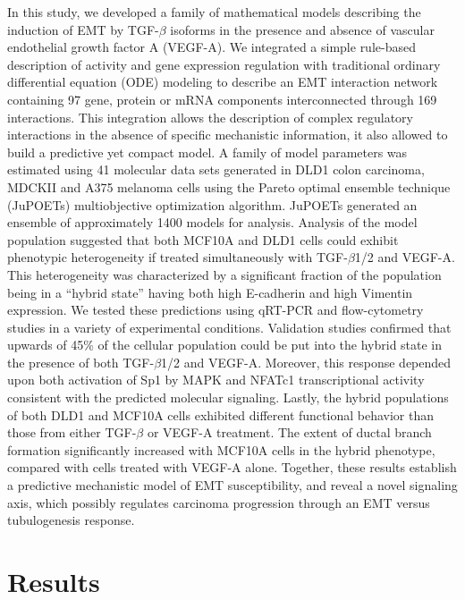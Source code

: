 \documentclass[11pt,letterpaper]{article}
\begin{document}
In this study, we developed a family of mathematical models describing the induction of EMT by TGF-$\beta$ isoforms in the presence and absence of vascular endothelial growth factor A (VEGF-A).
We integrated a simple rule-based description of activity and gene expression regulation with traditional ordinary differential equation (ODE) modeling to describe an EMT interaction network containing 97 gene, protein or mRNA components interconnected through 169 interactions.
This integration allows the description of complex regulatory interactions in the absence of specific mechanistic information, it also allowed to build a predictive yet compact model.
A family of model parameters was estimated using 41 molecular data sets generated in DLD1 colon carcinoma, MDCKII and A375 melanoma cells using the Pareto optimal ensemble technique (JuPOETs) multiobjective optimization algorithm.
JuPOETs generated an ensemble of approximately 1400 models for analysis.
Analysis of the model population suggested that both MCF10A and DLD1 cells could exhibit phenotypic heterogeneity if treated simultaneously with TGF-$\beta$1/2 and VEGF-A.
This heterogeneity was characterized by a significant fraction of the population being in a “hybrid state” having both high E-cadherin and high Vimentin expression.
We tested these predictions using qRT-PCR and flow-cytometry studies in a variety of experimental conditions.
Validation studies confirmed that upwards of 45\% of the cellular population could be put into the hybrid state in the presence of both TGF-$\beta$1/2 and VEGF-A.
Moreover, this response depended upon both activation of Sp1 by MAPK and NFATc1 transcriptional activity consistent with the predicted molecular signaling.
Lastly, the hybrid populations of both DLD1 and MCF10A cells exhibited different functional behavior than those from either TGF-$\beta$ or VEGF-A treatment.
The extent of ductal branch formation significantly increased with MCF10A cells in the hybrid phenotype, compared with cells treated with VEGF-A alone.
Together, these results establish a predictive mechanistic model of EMT susceptibility, and reveal a novel signaling axis, which possibly regulates carcinoma progression through an EMT versus tubulogenesis response.

\clearpage

\section*{Results}
\end{document}
